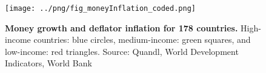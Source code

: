 \begin{figure}[h]
\caption{\label{fig:money_inflation_coded} \textbf{Money growth and deflator inflation for 178 countries.} High-income countries: blue circles, medium-income: green squares, and low-income: red triangles. {\tiny Source: Quandl, World Development Indicators, World Bank}}
\hspace*{-.5cm}\texttt{[image: ../png/fig\_moneyInflation\_coded.png]}
\end{figure}
